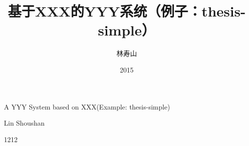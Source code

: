 \stuno{}
\title{基于XXX的YYY系统（例子：thesis-simple）}{A YYY System based on XXX(Example: thesis-simple)}
\author{林寿山}{Lin Shoushan}
\date{2015}{12}{12}
